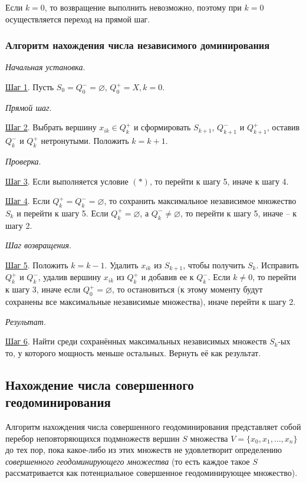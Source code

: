 \documentclass[bachelor, och, nir]{SCWorks}
\begin{document}
Если $k=0$, то возвращение выполнить невозможно, поэтому при $k=0$ осуществляется переход на прямой шаг.

\subsubsection{Алгоритм нахождения числа независимого доминирования}

\textit{Начальная установка}.

\underline{Шаг 1}. Пусть $S_0 = Q_0^- = \varnothing$, $Q_0^+ = X, k = 0$.

\textit{Прямой шаг}.

\underline{Шаг 2}. Выбрать вершину $x_{ik} \in Q_k^+$ и сформировать $S_{k + 1}$, $Q_{k + 1}^-$ и $Q_{k + 1}^+$,
оставив $Q_k^-$ и $Q_k^+$ нетронутыми. Положить $k = k + 1$.

\textit{Проверка}.

\underline{Шаг 3}. Если выполняется условие $(*)$, то перейти к шагу 5, иначе к шагу 4.

\underline{Шаг 4}. Если $Q_k^+ = Q_k^- = \varnothing$, то сохранить максимальное независимое множество $S_k$ и перейти к шагу 5. Если $Q_k^+ = \varnothing$, а $Q_k^- \neq \varnothing $, то перейти к шагу 5, иначе -- к шагу 2.

\textit{Шаг возвращения}.

\underline{Шаг 5}. Положить $k = k - 1$. Удалить $x_{ik}$ из $S_{k+1}$, чтобы получить $S_k$. Исправить $Q_k^+$ и $Q_k^-$, удалив вершину $x_{ik}$ из $Q_k^+$  и добавив ее к $Q_k^-$. Если $k \neq 0$, то перейти к шагу 3, иначе если $Q_0^+ = \varnothing$, то остановиться (к этому моменту будут сохранены все максимальные независимые множества), иначе перейти к шагу 2.

\textit{Результат}.

\underline{Шаг 6}. Найти среди сохранённых максимальных независимых множеств $S_k$-ых то, у которого
мощность меньше остальных. Вернуть её как результат.

\subsection{Нахождение числа совершенного геодоминирования}
Алгоритм нахождения числа совершенного геодоминирования представляет собой 
перебор неповторяющихся подмножеств вершин $S$ множества $V = \{x_0, x_1, \dots, x_n\}$ до тех пор, пока
какое-либо из этих множеств не удовлетворит определению \textit{совершенного 
геодоминирующего множества} (то есть каждое такое $S$ рассматривается как 
потенциальное совершенное геодоминирующее множество). 
\end{document}
